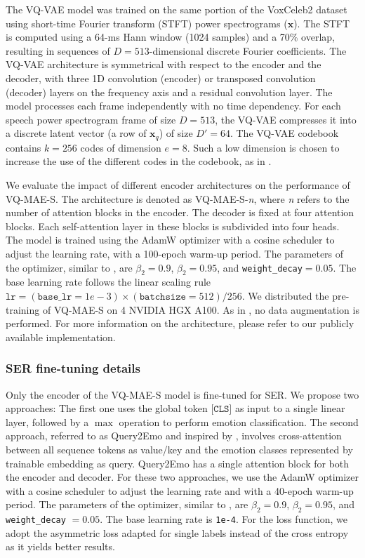 \documentclass{article}
\begin{document}
The VQ-VAE model was trained on the same portion of the VoxCeleb2 dataset using short-time Fourier transform (STFT) power spectrograms ($\mathbf{x}$). The STFT is computed using a 64-ms Hann window (1024 samples) and a 70\% overlap, resulting in sequences of $D=513$-dimensional discrete Fourier coefficients. The VQ-VAE architecture is symmetrical with respect to the encoder and the decoder, with three 1D convolution (encoder) or transposed convolution (decoder) layers on the frequency axis and a residual convolution layer. The model processes each frame independently with no time dependency. For each speech power spectrogram frame of size $D=513$, the VQ-VAE compresses it into a discrete latent vector (a row of $\mathbf{x}_q$) of size $D'=64$. 
The VQ-VAE codebook contains $k=256$ codes of dimension $e=8$. Such a low dimension is chosen to increase the use of the different codes in the codebook, as in \cite{yuvector}. 


We evaluate the impact of different encoder architectures on the performance of VQ-MAE-S. The architecture is denoted as VQ-MAE-S-\emph{n}, where \emph{n} refers to the number of attention blocks in the encoder.  The decoder is fixed at four attention blocks. Each self-attention layer in these blocks is subdivided into four heads. The model is trained using the AdamW optimizer \cite{loshchilov2017decoupled} with a cosine scheduler to adjust the learning rate, with a 100-epoch warm-up period. The parameters of the optimizer, similar to \cite{he2022masked}, are $\beta_2=0.9$, $\beta_2=0.95$, and \texttt{weight\_decay}$=0.05$. The base learning rate follows the linear scaling rule \cite{goyal2017accurate} $\texttt{lr} = (\texttt{base\_lr} = 1e-3) \times (\texttt{batchsize} = 512) / 256$. We distributed the pre-training of VQ-MAE-S on 4 NVIDIA HGX A100. As in \cite{xu2022masked}, no data augmentation is performed. For more information on the architecture, please refer to our publicly available implementation.

\subsubsection{SER fine-tuning details}

Only the encoder of the VQ-MAE-S model is fine-tuned for SER. We propose two approaches: The first one uses the global token $\texttt{[CLS]}$ as input to a single linear layer, followed by a $\max$ operation to perform emotion classification.
The second approach, referred to as Query2Emo and inspired by \cite{liu2021query2label}, involves cross-attention between all sequence tokens as value/key and the emotion classes represented by trainable embedding as query. Query2Emo has a single attention block for both the encoder and decoder. For these two approaches, we use the AdamW optimizer \cite{loshchilov2017decoupled} with a cosine scheduler to adjust the learning rate and with a 40-epoch warm-up period. The parameters of the optimizer, similar to \cite{he2022masked}, are $\beta_2=0.9$, $\beta_2=0.95$, and \texttt{weight\_decay} $=0.05$. The base learning rate is \texttt{1e-4}. For the loss function, we adopt the asymmetric loss \cite{ridnik2021asymmetric} adapted for single labels instead of the cross entropy as it yields better results. 
\end{document}
